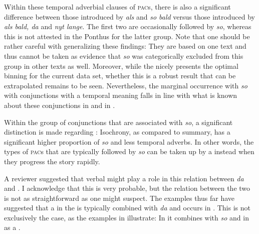 \documentclass[output=paper,colorlinks,citecolor=brown]{langscibook}
\begin{document}
Within these temporal adverbial clauses of \textsc{pac}s, there is also a significant difference between those introduced by \textit{als} and \textit{so bald} versus those introduced by \textit{als bald, da} and \textit{nyt lange}. The first two are occasionally followed by \textit{so}, whereas this is not attested in the Ponthus for the latter group. Note that one should be rather careful with generalizing these findings: They are based on one text and thus cannot be taken as evidence that \textit{so} was categorically excluded from this group in other texts as well. Moreover, while the  nicely presents the optimal binning for the current data set, whether this is a robust result that can be extrapolated remains to be seen. Nevertheless, the marginal occurrence with \textit{so} with conjunctions with a temporal meaning falls in line with what is known about these conjunctions in  and in .

Within the group of conjunctions that are associated with \textit{so}, a significant distinction is made regarding : Isochrony, as compared to summary, has a significant higher proportion of \textit{so} and less temporal adverbs. In other words, the types of \textsc{pac}s that are typically followed by \textit{so} can be taken up by a  instead when they progress the story rapidly.

A reviewer suggested that verbal  might play a role in this relation between \textit{da} and . I acknowledge that this is very probable, but the relation between the two is not as straightforward as one might suspect. The examples thus far have suggested that a  in the  is typically combined with \textit{da} and occurs in . This is not exclusively the case, as the examples in  illustrate: In  it combines with \textit{so} and in  as a .
\end{document}
